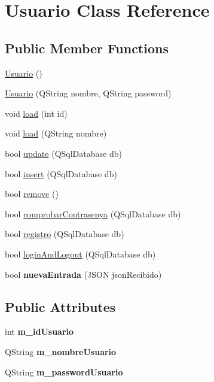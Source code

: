 \hypertarget{classUsuario}{}\section{Usuario Class Reference}
\label{classUsuario}
\subsection*{Public Member Functions}
\begin{DoxyCompactItemize}
\item 
\mbox{\hyperlink{classUsuario_aa85a5371a098dfba5449140d9b8a472f}{Usuario}} ()
\item 
\mbox{\hyperlink{classUsuario_a21975acad49ffd19aa3cf818d03527ad}{Usuario}} (Q\+String nombre, Q\+String password)
\item 
void \mbox{\hyperlink{classUsuario_a582cfc5fb035575f66240d1784c50632}{load}} (int id)
\item 
void \mbox{\hyperlink{classUsuario_ab1cdc9970f8f50f4b554a563fd2ab41d}{load}} (Q\+String nombre)
\item 
bool \mbox{\hyperlink{classUsuario_af4164d59cbff1c6b19bd489b1cacf743}{update}} (Q\+Sql\+Database db)
\item 
bool \mbox{\hyperlink{classUsuario_a26adf3b94603d9265f4de3fc69753f25}{insert}} (Q\+Sql\+Database db)
\item 
bool \mbox{\hyperlink{classUsuario_a2e01f0e772aabe9c66ef326eca458405}{remove}} ()
\item 
bool \mbox{\hyperlink{classUsuario_a22724fa57c4b6eca3330b8bc384700b5}{comprobar\+Contrasenya}} (Q\+Sql\+Database db)
\item 
bool \mbox{\hyperlink{classUsuario_a8c8c3ee57470ff27e9da55f6e6eb0d17}{registro}} (Q\+Sql\+Database db)
\item 
bool \mbox{\hyperlink{classUsuario_a800927743ba5e998af9a6040baea0b88}{login\+And\+Logout}} (Q\+Sql\+Database db)
\item 
\mbox{\label{classUsuario_a8776b368054f04bf01dd238efe19166d}} 
bool {\bfseries nueva\+Entrada} (J\+S\+ON json\+Recibido)
\end{DoxyCompactItemize}
\subsection*{Public Attributes}
\begin{DoxyCompactItemize}
\item 
\mbox{\label{classUsuario_adceaf46ad17f76c19ec6f2a98baba133}} 
int {\bfseries m\+\_\+id\+Usuario}
\item 
\mbox{\label{classUsuario_a69a690d2e969ab1b32ae18f94e0fb0e3}} 
Q\+String {\bfseries m\+\_\+nombre\+Usuario}
\item 
\mbox{\label{classUsuario_a6771c927d80c3c8495ed08c16dfc8488}} 
Q\+String {\bfseries m\+\_\+password\+Usuario}
\end{DoxyCompactItemize}



